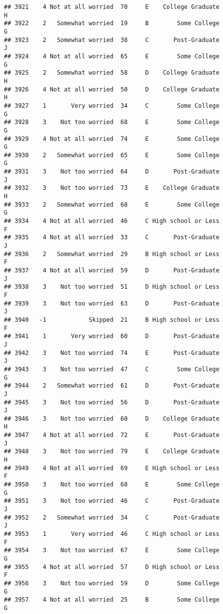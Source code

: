 \documentclass[
]{article}
\begin{document}
\begin{verbatim}
## 3921    4 Not at all worried  70     E    College Graduate         H
## 3922    2   Somewhat worried  19     B        Some College         G
## 3923    2   Somewhat worried  38     C       Post-Graduate         J
## 3924    4 Not at all worried  65     E        Some College         G
## 3925    2   Somewhat worried  58     D    College Graduate         H
## 3926    4 Not at all worried  50     D    College Graduate         H
## 3927    1       Very worried  34     C        Some College         G
## 3928    3    Not too worried  68     E        Some College         G
## 3929    4 Not at all worried  74     E        Some College         G
## 3930    2   Somewhat worried  65     E        Some College         G
## 3931    3    Not too worried  64     D       Post-Graduate         J
## 3932    3    Not too worried  73     E    College Graduate         H
## 3933    2   Somewhat worried  68     E        Some College         G
## 3934    4 Not at all worried  46     C High school or Less         F
## 3935    4 Not at all worried  33     C       Post-Graduate         J
## 3936    2   Somewhat worried  29     B High school or Less         F
## 3937    4 Not at all worried  59     D       Post-Graduate         J
## 3938    3    Not too worried  51     D High school or Less         F
## 3939    3    Not too worried  63     D       Post-Graduate         J
## 3940   -1            Skipped  21     B High school or Less         F
## 3941    1       Very worried  60     D       Post-Graduate         J
## 3942    3    Not too worried  74     E       Post-Graduate         J
## 3943    3    Not too worried  47     C        Some College         G
## 3944    2   Somewhat worried  61     D       Post-Graduate         J
## 3945    3    Not too worried  56     D       Post-Graduate         J
## 3946    3    Not too worried  60     D    College Graduate         H
## 3947    4 Not at all worried  72     E       Post-Graduate         J
## 3948    3    Not too worried  79     E    College Graduate         H
## 3949    4 Not at all worried  69     E High school or Less         F
## 3950    3    Not too worried  68     E        Some College         G
## 3951    3    Not too worried  46     C       Post-Graduate         J
## 3952    2   Somewhat worried  34     C       Post-Graduate         J
## 3953    1       Very worried  46     C High school or Less         F
## 3954    3    Not too worried  67     E        Some College         G
## 3955    4 Not at all worried  57     D High school or Less         F
## 3956    3    Not too worried  59     D        Some College         G
## 3957    4 Not at all worried  25     B        Some College         G

\end{verbatim}
\end{document}
